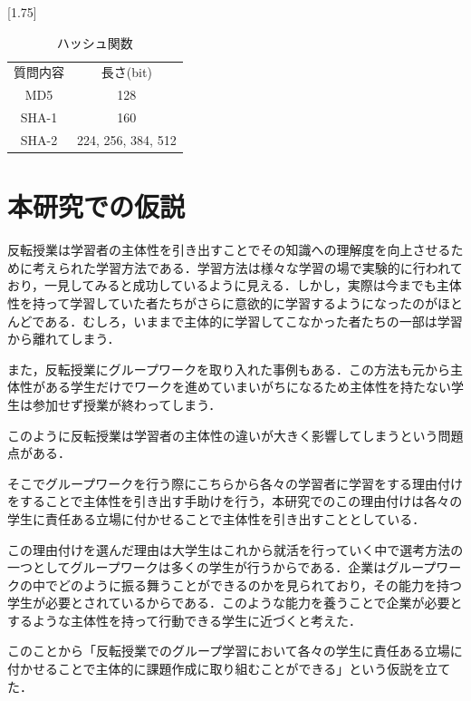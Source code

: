 \documentclass[a4j,11pt]{jsarticle}
\begin{document}
\begin{table}[htbp]
\begin{center}
\caption{ハッシュ関数}
\scalebox{1.75}[1.75]{
\begin{tabular}{|c|c|}
\cline{1-2}
 質問内容 & 長さ(bit) \\ \cline{1-2}  
MD5 & 128  \\ \cline{1-2}  
 SHA-1 &  160\\ \cline{1-2}  
 SHA-2 &  224, 256, 384, 512\\ \cline{1-2}  
\end{tabular}
}
\label{hash}
\end{center}
\end{table}

\newpage

\section{本研究での仮説}
反転授業は学習者の主体性を引き出すことでその知識への理解度を向上させるために考えられた学習方法である．学習方法は様々な学習の場で実験的に行われており，一見してみると成功しているように見える．しかし，実際は今までも主体性を持って学習していた者たちがさらに意欲的に学習するようになったのがほとんどである．むしろ，いままで主体的に学習してこなかった者たちの一部は学習から離れてしまう．

また，反転授業にグループワークを取り入れた事例もある．この方法も元から主体性がある学生だけでワークを進めていまいがちになるため主体性を持たない学生は参加せず授業が終わってしまう．

このように反転授業は学習者の主体性の違いが大きく影響してしまうという問題点がある．

そこでグループワークを行う際にこちらから各々の学習者に学習をする理由付けをすることで主体性を引き出す手助けを行う，本研究でのこの理由付けは各々の学生に責任ある立場に付かせることで主体性を引き出すこととしている．

この理由付けを選んだ理由は大学生はこれから就活を行っていく中で選考方法の一つとしてグループワークは多くの学生が行うからである．企業はグループワークの中でどのように振る舞うことができるのかを見られており，その能力を持つ学生が必要とされているからである．このような能力を養うことで企業が必要とするような主体性を持って行動できる学生に近づくと考えた．

このことから「反転授業でのグループ学習において各々の学生に責任ある立場に付かせることで主体的に課題作成に取り組むことができる」という仮説を立てた．

\newpage
\end{document}
